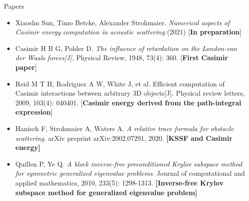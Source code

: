 \documentclass[dvipsnames,10pt]{beamer}
\begin{document}
\begin{frame}{Papers}
\vspace{.3cm}
{\small

    \begin{itemize}
    \item Xiaoshu Sun, Timo Betcke, Alexander Strohmaier. \textit{Numerical aspects of Casimir energy computation in acoustic scattering} (2021) [\textbf{In preparation}]
    \vspace{0.1cm}
        \item Casimir H B G, Polder D. \textit{The influence of retardation on the London-van der Waals forces[J]}. Physical Review, 1948, 73(4): 360.
        [\textbf{First Casimir paper}]
        \vspace{0.1cm}
        \item Reid M T H, Rodriguez A W, White J, et al. Efficient computation of Casimir interactions between arbitrary 3D objects[J]. Physical review letters, 2009, 103(4): 040401.
        [\textbf{Casimir energy derived from the path-integral expression}]
                \vspace{0.1cm}

        \item Hanisch F, Strohmaier A, Waters A.\textit{ A relative trace formula for obstacle scattering}. arXiv preprint arXiv:2002.07291, 2020. 
        \textbf{[KSSF and Casimir energy]}
                \vspace{0.1cm}

        \item Quillen P, Ye Q. \textit{A block inverse-free preconditioned Krylov subspace method for symmetric generalized eigenvalue problems}. Journal of computational and applied mathematics, 2010, 233(5): 1298-1313.
        \textbf{[Inverse-free Krylov subspace method for generalized eigenvalue problem]}
                \vspace{0.1cm}
                \end{itemize}
}
\end{frame}
\end{document}
